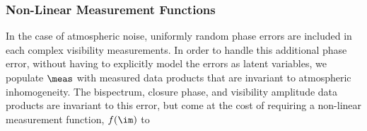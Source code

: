 
\vspace{.1in}
\subsubsection{Non-Linear Measurement Functions}
In the case of atmospheric noise, uniformly random phase errors are included in each complex visibility measurements. 
In order to handle this additional phase error, without having to explicitly model the errors as latent variables, we populate $\meas$ with measured data products that are invariant to atmospheric inhomogeneity. 
The bispectrum, closure phase, and visibility amplitude data products are invariant to this error, but come at the cost of requiring a non-linear measurement function, $f(\im)$ to  




